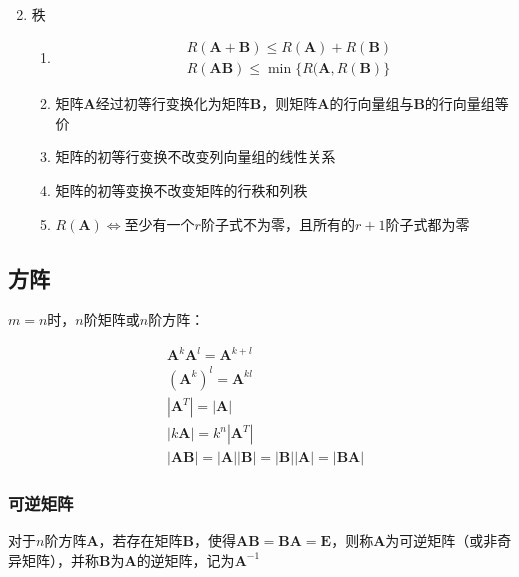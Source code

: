 \documentclass[12pt]{book}
\begin{document}
\begin{enumerate}[1.]
\begin{gather*}
          \end{gather*}
    \item 秩
          \begin{enumerate}[(1)]
              \item \begin{align*}
                         & R(\bm{A}+\bm{B})\leqslant R(\bm{A})+R(\bm{B} ) \\
                         & R(\bm{AB})\leqslant \min\{R(\bm{A},R(\bm{B})\}
                    \end{align*}
              \item 矩阵$\bm{A}$经过初等行变换化为矩阵$\bm{B}$，则矩阵$\bm{A}$的行向量组与$\bm{B}$的行向量组等价
              \item 矩阵的初等行变换不改变列向量组的线性关系
              \item 矩阵的初等变换不改变矩阵的行秩和列秩
              \item $R(\bm{A})\Leftrightarrow$至少有一个$r$阶子式不为零，且所有的$r+1$阶子式都为零
          \end{enumerate}
\end{enumerate}



\subsection{方阵}

$m=n$时，$n$阶矩阵或$n$阶方阵：

\begin{align*}
& \mathbf{A}^k \mathbf{A}^l = \mathbf{A}^{k+l}  \\
& (\mathbf{A}^k)^l = \mathbf{A}^{kl} \\
& |\mathbf{A}^T| = |\mathbf{A}| \\
& |k \mathbf{A}| = k^n |\mathbf{A}^T| \\
& |\mathbf{A}\mathbf{B}| = |\mathbf{A}| |\mathbf{B}| = |\mathbf{B}| |\mathbf{A}| = |\mathbf{B}\mathbf{A}|
\end{align*}





\subsubsection{可逆矩阵}


对于$n$阶方阵$\bm{A}$，若存在矩阵$\bm{B}$，使得$\bm{AB}=\bm{BA}=\bm{E}$，则称$\bm{A}$为可逆矩阵（或非奇异矩阵），并称$\bm{B}$为$\bm{A}$的逆矩阵，记为$\bm{A}^{-1}$
\end{document}
